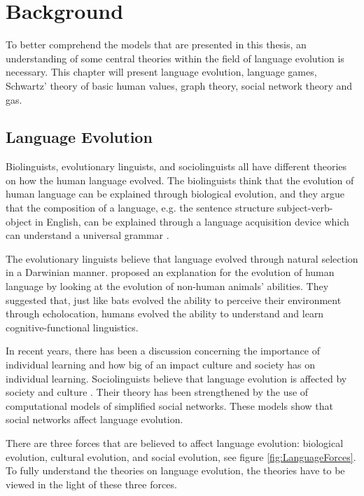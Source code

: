\acresetall
\chapter{Background}\label{ch:background}
To better comprehend the models that are presented in this thesis, an understanding of some central theories within the field of language evolution is necessary. This chapter will present language evolution, language games, Schwartz' theory of basic human values, graph theory, social network theory and \acp{ga}.

\section{Language Evolution}
Biolinguists, evolutionary linguists, and sociolinguists all have different theories on how the human language evolved. The biolinguists think that the evolution of human language can be explained through biological evolution, and they argue that the composition of a language, e.g. the sentence structure subject-verb-object in English, can be explained through a language acquisition device which can understand a universal grammar \citep{chomsky1965some}.

The evolutionary linguists believe that language evolved through natural selection in a Darwinian manner. \citet{pinker1994regular} proposed an explanation for the evolution of human language by looking at the evolution of non-human animals' abilities. They suggested that, just like bats evolved the ability to perceive their environment through echolocation, humans evolved the ability to understand and learn cognitive-functional linguistics.

In recent years, there has been a discussion concerning the importance of individual learning and how big of an impact culture and society has on individual learning. Sociolinguists believe that language evolution is affected by society and culture \citep{tomasello2003makes}. Their theory has been strengthened by the use of computational models of simplified social networks. These models show that social networks affect language evolution.

\label{EvoltionaryForces}
There are three forces that are believed to affect language evolution: biological evolution, cultural evolution, and social evolution, see figure \ref{fig:LanguageForces}. To fully understand the theories on language evolution, the theories have to be viewed in the light of these three forces.

